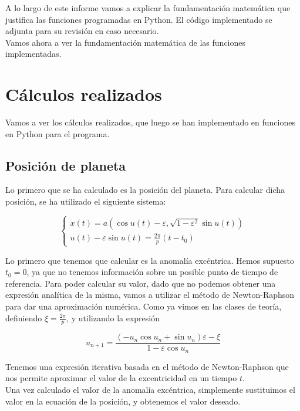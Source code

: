\documentclass[12pt]{article}
\begin{document}
A lo largo de este informe vamos a explicar la fundamentación
matemática que justifica las funciones programadas en Python. El
código implementado se adjunta para su revisión en caso necesario.\\

Vamos ahora a ver la fundamentación matemática de las funciones
implementadas.

\section{Cálculos realizados}

Vamos a ver los cálculos realizados, que luego se han implementado
en funciones en Python para el programa.

\subsection{Posición de planeta}

Lo primero que se ha calculado es la posición del planeta. Para
calcular dicha posición, se ha utilizado el siguiente sistema:

\begin{equation}
  \left\{
    \begin{array}{l}
      x(t) = a(\cos{u(t)} - \varepsilon, \sqrt{1 - \varepsilon^2}\sin{u(t)}) \\
      u(t) - \varepsilon \sin{u(t)} = \frac{2\pi}{p}(t - t_0)      
    \end{array}
  \right.
\end{equation}

Lo primero que tenemos que calcular es la anomalía excéntrica. Hemos
supuesto $t_0 = 0$, ya que no tenemos información sobre un posible
punto de tiempo de referencia. Para poder calcular su valor, dado que
no podemos obtener una expresión analítica de la misma, vamos a
utilizar el método de Newton-Raphson para dar una aproximación
numérica.  Como ya vimos en las clases de teoría, definiendo
$\xi = \frac{2\pi}{p}$, y utilizando la expresión

\[
u_{n+1} = \frac{(-u_n\cos{u_n} + \sin{u_n})\varepsilon - \xi}{1 -
  \varepsilon \cos{u_n}}
\]

Tenemos una expresión iterativa basada en el método de Newton-Raphson
que nos permite aproximar el valor de la excentricidad en un tiempo
$t$.\\

Una vez calculado el valor de la anomalía excéntrica, simplemente 
sustituimos el valor en la ecuación de la posición, y obtenemos el
valor deseado.
\end{document}
